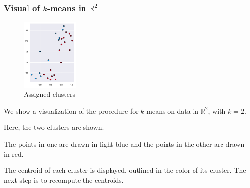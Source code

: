 \documentclass[smaller]{beamer}
\theoremstyle{example}
\begin{document}
\begin{frame}
    \frametitle{Visual of $k$-means in $\mathbb R^2$}
    
    \begin{figure}
        \begin{center}
            \includegraphics[width=0.25\textwidth]{../../Images/kmeans_1.png}
        \end{center}
        \caption{Assigned clusters}
    \end{figure}

    We show a visualization of the procedure for $k$-means on data in $\mathbb R^2$, with $k=2$.
    \vspace*{12pt}

    Here, the two clusters are shown. 
    
    The points in one are drawn in light blue and the points in the other are drawn in red.  

    The centroid of each cluster is displayed, outlined in the color of its cluster. The next step is to recompute the centroids.

\vfill
\end{frame}
\end{document}
